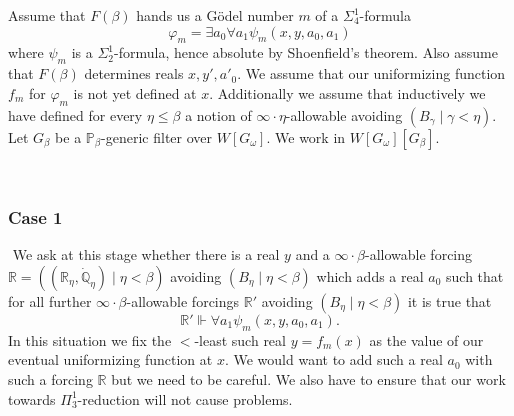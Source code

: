 \documentclass[a4paper,11pt]{article}
\newcommand{\forceP}{\mathbb{P}}
\newcommand{\forceQ}{\mathbb{Q}}
\newcommand{\forceR}{\mathbb{R}}
\begin{document}
Assume that $F(\beta)$ hands us a G\"odel number $m$ of a $\Sigma^1_4$-formula \[\varphi_m= \exists a_0 \forall a_1 \psi_m (x,y,a_0,a_1)\] where $\psi_m$ is a $\Sigma^1_2$-formula, hence absolute by Shoenfield's theorem. Also assume that $F(\beta)$ determines reals $x,y',a'_0$. We assume that our uniformizing function $f_m$ for $\varphi_m$ is not yet defined at $x$. Additionally we assume that inductively we have defined  for every $\eta \le \beta$ a notion of $\infty \cdot \eta$-allowable avoiding $(B_{\gamma} \mid  \gamma < \eta)$. Let $G_{\beta}$ be a $\forceP_{\beta}$-generic filter over $W[G_{\omega}]$. We work in $W[G_{\omega}] [G_{\beta}]$.
    ﻿

    ﻿
       \subsubsection{Case 1}
    ﻿
    We ask at this stage whether there is a real $y$ and a $\infty \cdot \beta$-allowable forcing $\forceR= ((\forceR_{\eta},\dot{\forceQ}_{\eta}) \mid \eta < \beta )$ avoiding $(B_{\eta} \mid \eta < \beta)$  which adds a real $a_0$ such that for all further $\infty \cdot \beta$-allowable forcings $\forceR'$ avoiding $(B_{\eta} \mid \eta < \beta)$  it is true that
    ﻿
    \[ \forceR' \Vdash \forall a_1 \psi_m (x,y,a_0,a_1). \]
    ﻿
In this situation we fix the $<$-least such real $y=f_m(x)$ as the value of our eventual uniformizing function at $x$. 
We would want to add such a real $a_0$ with such a forcing $\forceR$ but we need to be careful. 
We also have to ensure that our work towards $\Pi^1_3$-reduction will not cause problems.

\end{document}
